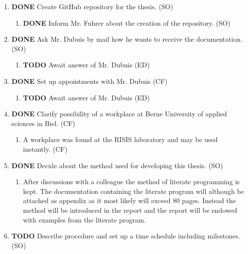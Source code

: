 \documentclass[10pt, openright, notitlepage]{scrreprt}
\begin{document}
\begin{enumerate}
\item {\bfseries\sffamily DONE} Create GitHub repository for the thesis. (SO)
\label{sec:org3f02c7e}
\begin{enumerate}
\item {\bfseries\sffamily DONE} Inform Mr. Fuhrer about the creation of the repository. (SO)
\label{sec:org48b443d}
\end{enumerate}

\item {\bfseries\sffamily DONE} Ask Mr. Dubuis by mail how he wants to receive the documentation. (SO)
\label{sec:org074e0ac}
\begin{enumerate}
\item {\bfseries\sffamily TODO} Await answer of Mr. Dubuis (ED)
\label{sec:org5dd2198}
\end{enumerate}

\item {\bfseries\sffamily DONE} Set up appointments with Mr. Dubuis (CF)
\label{sec:org9191020}
\begin{enumerate}
\item {\bfseries\sffamily TODO} Await answer of Mr. Dubuis (ED)
\label{sec:org398a0ed}
\end{enumerate}

\item {\bfseries\sffamily DONE} Clarify possibility of a workplace at Berne University of applied sciences in Biel. (CF)
\label{sec:org0596e59}
\begin{enumerate}
\item A workplace was found at the RISIS laboratory and may be used instantly. (CF)
\label{sec:orgb151130}
\end{enumerate}

\item {\bfseries\sffamily DONE} Decide about the method used for developing this thesis. (SO)
\label{sec:org05ed0de}
\begin{enumerate}
\item After discussions with a colleague the method of literate programming is
\label{sec:orga9a5f8f}
kept. The documentation containing the literate program will although be
attached as appendix as it most likely will exceed 80 pages. Instead the
method will be introduced in the report and the report will be endowed
with examples from the literate program.
\end{enumerate}

\item {\bfseries\sffamily TODO} Describe procedure and set up a time schedule including milestones. (SO)
\label{sec:orgf4793c0}
\end{enumerate}
\end{document}
